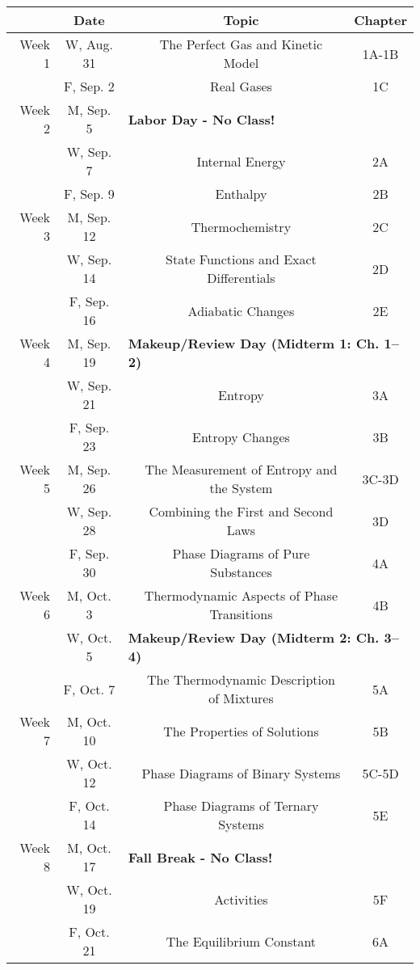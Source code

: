 \documentclass[12pt, letterpaper]{article}
\begin{document}
\noindent
\begin{tabular}{rcccc}
& Date && Topic & Chapter\\
\midrule
Week 1 & W, Aug. 31&& The Perfect Gas and Kinetic Model & 1A-1B\\
& F, Sep. 2&& Real Gases & 1C\\
\midrule
Week 2 & M, Sep. 5& \multicolumn{3}{l}{\textbf{Labor Day - No Class!}}\\
& W, Sep. 7&& Internal Energy & 2A\\
& F, Sep. 9&& Enthalpy & 2B\\
\midrule
Week 3 & M, Sep. 12&& Thermochemistry & 2C\\
& W, Sep. 14&& State Functions and Exact Differentials & 2D\\
& F, Sep. 16&& Adiabatic Changes & 2E\\
\midrule
Week 4 & M, Sep. 19& \multicolumn{3}{l}{\textbf{Makeup/Review Day (Midterm 1: Ch. 1--2)}}\\
& W, Sep. 21&& Entropy & 3A\\
& F, Sep. 23&& Entropy Changes & 3B\\
\midrule
Week 5 & M, Sep. 26&& The Measurement of Entropy and the System & 3C-3D\\
& W, Sep. 28&& Combining the First and Second Laws & 3D\\
& F, Sep. 30&& Phase Diagrams of Pure Substances & 4A\\
\midrule
Week 6 & M, Oct. 3&& Thermodynamic Aspects of Phase Transitions & 4B\\
& W, Oct. 5& \multicolumn{3}{l}{\textbf{Makeup/Review Day (Midterm 2: Ch. 3--4)}}\\
& F, Oct. 7&& The Thermodynamic Description of Mixtures & 5A\\
\midrule
Week 7 & M, Oct. 10&& The Properties of Solutions & 5B\\
& W, Oct. 12&& Phase Diagrams of Binary Systems & 5C-5D\\
& F, Oct. 14&& Phase Diagrams of Ternary Systems & 5E\\
\midrule
Week 8 & M, Oct. 17& \multicolumn{3}{l}{\textbf{Fall Break - No Class!}}\\
& W, Oct. 19&& Activities & 5F\\
& F, Oct. 21&& The Equilibrium Constant & 6A\\
\end{tabular}
\end{document}
